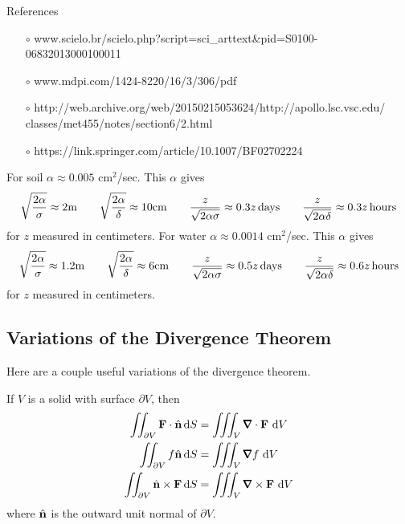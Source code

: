{\bigskip
\noindent References
\begin{itemize}\itemsep1pt \parskip0pt  \itemindent-15pt
\item[$\circ$] 
www.scielo.br/scielo.php?script=sci\_arttext\&pid=S0100-06832013000100011
\item[$\circ$] 
www.mdpi.com/1424-8220/16/3/306/pdf
\item[$\circ$]
http:/\!/web.archive.org/web/20150215053624/http:/\!/apollo.lsc.vsc.edu/
         \\\null\hskip3in classes/met455/notes/section6/2.html
\item[$\circ$]
https:/\!/link.springer.com/article/10.1007/BF02702224
\end{itemize}
For soil $\alpha\approx 0.005$ cm$^2$/sec. This $\alpha$
gives 
\begin{equation*}
\sqrt{\frac{2\alpha}{\sigma}}\approx  2{\rm m}\qquad
\sqrt{\frac{2\alpha}{\delta}}\approx 10{\rm cm} \qquad
\frac{z}{\sqrt{2\alpha\sigma}}\approx 0.3 z\,{\rm days} \qquad
\frac{z}{\sqrt{2\alpha\delta}}\approx 0.3z\,{\rm hours}
\end{equation*}
for $z$ measured in centimeters.
For water $\alpha\approx 0.0014$ cm$^2$/sec. This $\alpha$
gives 
\begin{equation*}
\sqrt{\frac{2\alpha}{\sigma}}\approx  1.2{\rm m}\qquad
\sqrt{\frac{2\alpha}{\delta}}\approx 6{\rm cm} \qquad
\frac{z}{\sqrt{2\alpha\sigma}}\approx 0.5 z\,{\rm days} \qquad
\frac{z}{\sqrt{2\alpha\delta}}\approx 0.6z\,{\rm hours}
\end{equation*}
for $z$ measured in centimeters.

}


\subsection{Variations of the Divergence Theorem}\label{sec:divVar}
Here are a couple useful variations of the divergence theorem.


\begin{theorem}\label{thm:divVrn}
If $V$ is a solid with surface $\partial V$, then
\begin{align*}
\dblInt_{\partial V} \vF\cdot\hn\,\dee{S}
&=\tripInt_V\vnabla\cdot\vF\ \dee{V} \\
\dblInt_{\partial V} f \hn\,\dee{S}
&=\tripInt_V\vnabla f\ \dee{V} \\
\dblInt_{\partial V} \hn\times\vF\,\dee{S}
&=\tripInt_V\vnabla\times\vF\ \dee{V}
\end{align*}
where $\hat{\mathbf{n}}$ is the outward unit normal of $\partial V$.
\end{theorem}

